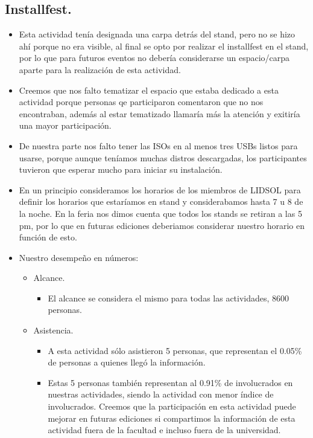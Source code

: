 \documentclass[a4paper,11pt]{article}                 %
\begin{document}
  
  \subsection{Installfest.}  
  
   \begin{itemize}
    \item Esta actividad tenía designada una carpa detrás del stand, pero no se hizo ahí porque no era visible, al final se opto por realizar el installfest en el stand, por lo que para futuros eventos no debería considerarse un espacio/carpa aparte para la realización de esta actividad.
    \item Creemos que nos falto tematizar el espacio que estaba dedicado a esta actividad porque personas qe participaron comentaron que no nos encontraban, además al estar tematizado llamaría más la atención y exitiría una mayor participación.
    \item De nuestra parte nos falto tener las ISOs en al menos tres USBs listos para usarse, porque aunque teníamos muchas distros descargadas, los participantes tuvieron que esperar mucho para iniciar su instalación.
    \item En un principio consideramos los horarios de los miembros de LIDSOL para definir los horarios que estaríamos en stand y considerabamos hasta 7 u 8 de la noche. En la feria nos dimos cuenta que todos los stands se retiran a las 5 pm, por lo que en futuras ediciones deberiamos considerar nuestro horario en función de esto.
    
    
    \item Nuestro desempeño en números:
    
    \begin{itemize}
    \item Alcance.
    \begin{itemize}
      \item El alcance se considera el mismo para todas las actividades, 8600 personas.
    \end{itemize}

    \item Asistencia.
    \begin{itemize}
      \item A esta actividad sólo asistieron 5 personas, que representan el 0.05\% de personas a quienes llegó la información.
      \item Estas 5 personas también representan al 0.91\% de involucrados en nuestras actividades, siendo la actividad con menor índice de involucrados. Creemos que la participación en esta actividad puede mejorar en futuras ediciones si compartimos la información de esta actividad fuera de la facultad e incluso fuera de la universidad.
    \end{itemize}
    \end{itemize} 
    
  \end{itemize}
\end{document}
